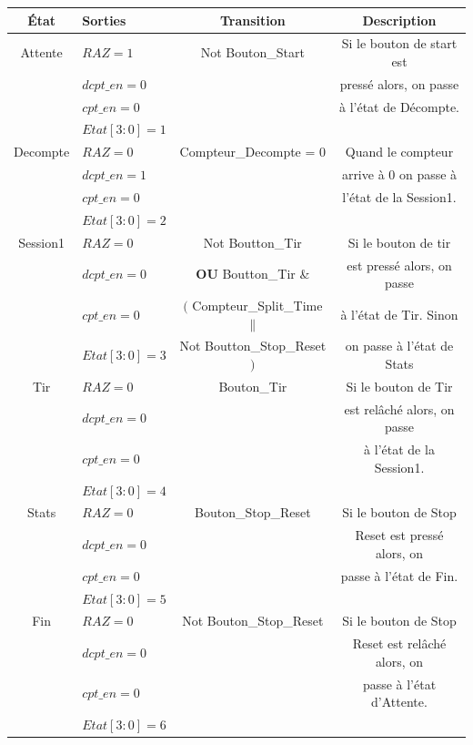 \documentclass{rapport}
\begin{document}
\begin{center}
    \begin{tabular}{ |c|l|c|c| } 
        \hline
            \textbf{État} & \textbf{Sorties} & \textbf{Transition} & \textbf{Description} \\
        \hline
            Attente & $RAZ = 1$ & Not Bouton\_Start & Si le bouton de start est \\
            & $dcpt\_en = 0$ & & pressé alors, on passe  \\
            & $cpt\_en = 0$ & & à l'état de Décompte. \\
            & $Etat[3:0] = 1$ & &  \\
        \hline
            Decompte & $RAZ = 0$ & Compteur\_Decompte = 0 & Quand le compteur \\
            & $dcpt\_en = 1$ & & arrive à 0 on passe à  \\
            & $cpt\_en = 0$ & & l'état de la Session1. \\
            & $Etat[3:0] = 2$ & &  \\
        \hline
            Session1 & $RAZ = 0$ & Not Boutton\_Tir & Si le bouton de tir \\
            & $dcpt\_en = 0$ & \textbf{OU} Boutton\_Tir \& & est pressé alors, on passe \\
            & $cpt\_en = 0$ & $($ Compteur\_Split\_Time $\|$ &  à l'état de Tir. Sinon \\
            & $Etat[3:0] = 3$ & Not Boutton\_Stop\_Reset $)$ & on passe à l'état de Stats  \\
        \hline
            Tir & $RAZ = 0$ & Bouton\_Tir & Si le bouton de Tir  \\
            & $dcpt\_en = 0$ & & est relâché alors, on passe \\
            & $cpt\_en = 0$ & &  à l'état de la Session1. \\
            & $Etat[3:0] = 4$ & &  \\
        \hline
            Stats & $RAZ = 0$ & Bouton\_Stop\_Reset & Si le bouton de Stop  \\
            & $dcpt\_en = 0$ & & Reset est pressé alors, on  \\
            & $cpt\_en = 0$ & & passe à l'état de Fin. \\
            & $Etat[3:0] = 5$ & &  \\
        \hline
            Fin & $RAZ = 0$ & Not Bouton\_Stop\_Reset & Si le bouton de Stop \\
            & $dcpt\_en = 0$ & & Reset est relâché alors, on  \\
            & $cpt\_en = 0$ & & passe à l'état d'Attente. \\
            & $Etat[3:0] = 6$ & &  \\
        \hline
    \end{tabular}
\end{center}
\end{document}
